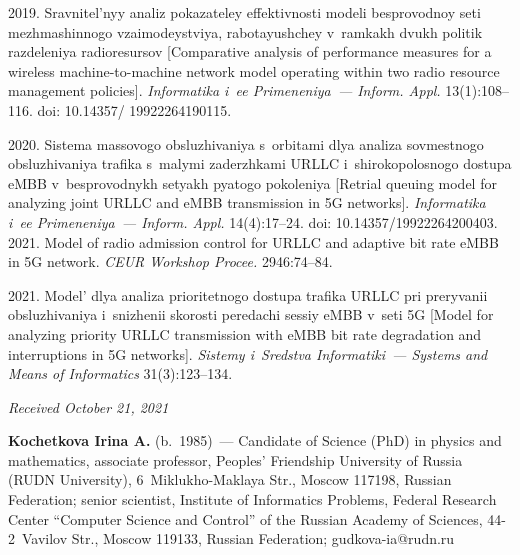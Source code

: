 \begin{multicols}{2}
{{\begin{thebibliography}{99}
2019. Sravnitel'nyy analiz pokazateley effektivnosti modeli besprovodnoy seti mezhmashinnogo 
vzaimodeystviya, rabotayushchey v~ramkakh dvukh politik razdeleniya radioresursov 
[Comparative analysis of performance measures for a wireless machine-to-machine network model 
operating within two radio resource management policies]. \textit{Informatika i~ee  
Primeneniya~--- Inform. Appl.} 13(1):108--116.
doi: 10.14357/ 19922264190115.

   2020. Sistema massovogo obsluzhivaniya s~orbitami dlya analiza so\-vmest\-no\-go 
obsluzhivaniya trafika s~malymi zaderzhkami URLLC i~shirokopolosnogo dostupa eMBB 
v~besprovodnykh setyakh pyatogo pokoleniya [Retrial queuing model for analyzing joint URLLC 
and eMBB transmission in 5G networks].
 \textit{Informatika i~ee Primeneniya~--- Inform. Appl.} 
14(4):17--24. doi: 10.14357/19922264200403.
2021. Model of radio admission control for URLLC and adaptive bit rate eMBB in 5G network. 
\textit{CEUR Workshop Procee.} 2946:74--84. 

\pagebreak

   2021. Model' 
dlya analiza prioritetnogo dostupa trafika URLLC pri preryvanii obsluzhivaniya i~snizhenii skorosti 
peredachi sessiy eMBB v~seti 5G [Model for analyzing priority URLLC transmission with eMBB 
bit rate degradation and interruptions in 5G networks]. \textit{Sistemy i~Sredstva Informatiki~--- 
Systems and Means of Informatics} 31(3):123--134.
 \end{thebibliography}

 }
 }

\end{multicols}

\vspace*{-3pt}

\hfill{\small\textit{Received October 21, 2021}}


  
  \Contr
  
  \noindent
  \textbf{Kochetkova Irina A.} (b.\ 1985)~--- Candidate of Science (PhD) in physics and 
mathematics, associate professor, Peoples' Friendship University of Russia (RUDN University), 
6~Miklukho-Maklaya Str., Moscow 117198, Russian Federation; senior scientist, Institute of 
Informatics Problems, Federal Research Center ``Computer Science and Control'' of the Russian 
Academy of Sciences, 44-2~Vavilov Str., Moscow 119133, Russian Federation;  
\mbox{gudkova-ia@rudn.ru}
  
